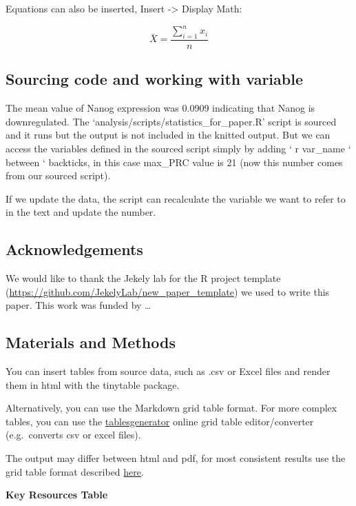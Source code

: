 \documentclass[
  11pt,
]{article}
\begin{document}
Equations can also be inserted, Insert -\textgreater{} Display Math:

\[
\bar{X} = \frac{\sum_{i=1}^{n} x_{i}}{n}
\]

\hfill\break

\subsection{Sourcing code and working with
variable}\label{sourcing-code-and-working-with-variable}

The mean value of Nanog expression was 0.0909 indicating that Nanog is
downregulated. The `analysis/scripts/statistics\_for\_paper.R' script is
sourced and it runs but the output is not included in the knitted
output. But we can access the variables defined in the sourced script
simply by adding ` r var\_name ` between ` backticks, in this case
max\_PRC value is 21 (now this number comes from our sourced script).

If we update the data, the script can recalculate the variable we want
to refer to in the text and update the number.

\subsection{Acknowledgements}\label{acknowledgements}

We would like to thank the Jekely lab for the R project template
(\url{https://github.com/JekelyLab/new_paper_template}) we used to write
this paper. This work was funded by \ldots{}

\subsection{Materials and Methods}\label{materials-and-methods}

You can insert tables from source data, such as .csv or Excel files and
render them in html with the tinytable package.

Alternatively, you can use the Markdown grid table format. For more
complex tables, you can use the
\href{https://www.tablesgenerator.com/markdown_tables}{tablesgenerator}
online grid table editor/converter (e.g.~converts csv or excel files).

The output may differ between html and pdf, for most consistent results
use the grid table format described
\href{https://quarto.org/docs/authoring/tables.html}{here}.

\textbf{Key Resources Table}
\end{document}
